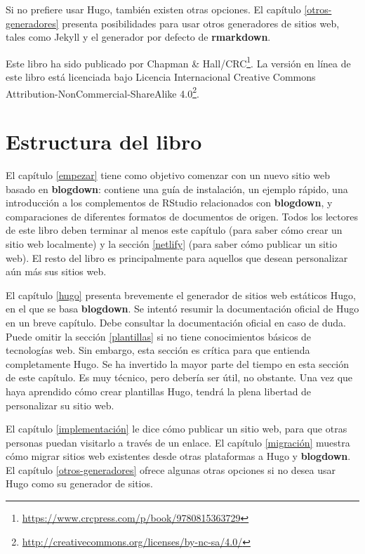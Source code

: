 \documentclass[12pt,]{krantz}
\renewcommand{\href}[2]{#2\footnote{\url{#1}}}
\theoremstyle{definition}
\theoremstyle{definition}
\theoremstyle{definition}
\theoremstyle{remark}
\begin{document}
Si no prefiere usar Hugo, también existen otras opciones. El capítulo
\ref{otros-generadores} presenta posibilidades para usar otros
generadores de sitios web, tales como Jekyll y el generador por defecto
de \textbf{rmarkdown}.

Este libro ha sido publicado por
\href{https://www.crcpress.com/p/book/9780815363729}{Chapman \&
Hall/CRC}. La versión en línea de este libro está licenciada bajo
\href{http://creativecommons.org/licenses/by-nc-sa/4.0/}{Licencia
Internacional Creative Commons Attribution-NonCommercial-ShareAlike
4.0}.

\hypertarget{estructura-del-libro}{%
\section*{Estructura del libro}\label{estructura-del-libro}}


El capítulo \ref{empezar} tiene como objetivo comenzar con un nuevo
sitio web basado en \textbf{blogdown}: contiene una guía de instalación,
un ejemplo rápido, una introducción a los complementos de RStudio
relacionados con \textbf{blogdown}, y comparaciones de diferentes
formatos de documentos de origen. Todos los lectores de este libro deben
terminar al menos este capítulo (para saber cómo crear un sitio web
localmente) y la sección \ref{netlify} (para saber cómo publicar un
sitio web). El resto del libro es principalmente para aquellos que
desean personalizar aún más sus sitios web.

El capítulo \ref{hugo} presenta brevemente el generador de sitios web
estáticos Hugo, en el que se basa \textbf{blogdown}. Se intentó resumir
la documentación oficial de Hugo en un breve capítulo. Debe consultar la
documentación oficial en caso de duda. Puede omitir la sección
\ref{plantillas} si no tiene conocimientos básicos de tecnologías web.
Sin embargo, esta sección es crítica para que entienda completamente
Hugo. Se ha invertido la mayor parte del tiempo en esta sección de este
capítulo. Es muy técnico, pero debería ser útil, no obstante. Una vez
que haya aprendido cómo crear plantillas Hugo, tendrá la plena libertad
de personalizar su sitio web.

El capítulo \ref{implementación} le dice cómo publicar un sitio web,
para que otras personas puedan visitarlo a través de un enlace. El
capítulo \ref{migración} muestra cómo migrar sitios web existentes desde
otras plataformas a Hugo y \textbf{blogdown}. El capítulo
\ref{otros-generadores} ofrece algunas otras opciones si no desea usar
Hugo como su generador de sitios.
\end{document}
